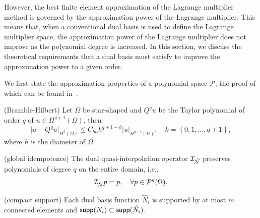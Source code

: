 However, the best finite element approximation of the Lagrange multiplier method is governed by the approximation power of the Lagrange multiplier. This means that, when a conventional dual basis is used to define the Lagrange multiplier space, the approximation power of the Lagrange multiplier does not improve as the polynomial degree is increased. In this section, we discuss the theoretical requirements that a dual basis must satisfy to improve the approximation power to a given order. \par

We first state the approximation properties of a polynomial space $\mathcal{P}$, the proof of which can be found in~\cite{brenner_mathematical_2007}.
\begin{lemma}\label{lm:bramble-hilbert}
	(Bramble-Hilbert) Let $\Omega$ be star-shaped and $Q^qu$ be the Taylor polynomial of order $q$ of $u\in{H}^{q+1}(\Omega)$, then
	\begin{equation}
		\vert{u-Q^qu}\vert_{H^k(\Omega)}\leq{}C_{bh}h^{q+1-k}\vert{u}\vert_{H^{q+1}(\Omega)},\quad{}k=\left\{0,1,\dots,q+1\right\},
	\end{equation}
	where $h$ is the diameter of $\Omega$.
\end{lemma}

\begin{assumption}\label{aspt:global_polynomial_reproduction}
	(global idempotence) The dual quasi-interpolation operator $\mathcal{I}_{\hat{\mathcal{N}}}$ preserves polynomials of degree $q$ on the entire domain, i.e.,
	\begin{equation}
		\mathcal{I}_{\hat{\mathcal{N}}}p=p,\quad\forall{}p\in\mathcal{P}^q{(\Omega)}.
	\end{equation}
\end{assumption}

\begin{assumption}\label{aspt:local_support}
	(compact support) Each dual basis function $\hat{N}_i$ is supported by at most $m$ connected elements and $\mathop{\mathsf{supp}}({N}_i)\subset\mathop{\mathsf{supp}}(\hat{N}_i)$.
\end{assumption}

